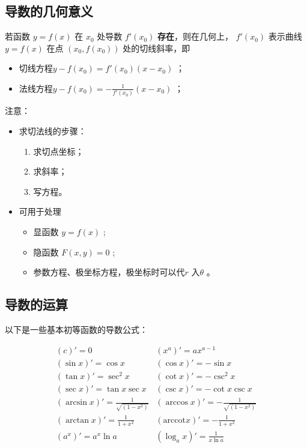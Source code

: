 \subsection{导数的几何意义}

若函数 $ y=f(x) $ 在 $ x_0 $ 处导数 $ f'(x_0) $ \textbf{存在}，则在几何上， $ f'(x_0) $ 表示曲线
$ y=f(x) $ 在点 $ (x_0,f(x_0)) $ 处的切线斜率，即\begin{itemize}
    \item 切线方程$ y-f(x_0)=f'(x_0)(x-x_0) $ ；
    \item 法线方程$ y-f(x_0)=-\frac1{f'(x_0)}(x-x_0) $ ；
\end{itemize}

注意：
\begin{itemize}
    \item 求切法线的步骤：\begin{enumerate}
        \item 求切点坐标；
        \item 求斜率；
        \item 写方程。
    \end{enumerate}
    \item 可用于处理\begin{itemize}
        \item 显函数 $ y=f(x) $ ;
        \item 隐函数 $ F(x,y)=0 $ ;
        \item 参数方程、极坐标方程，极坐标时可以代$ r $ 入$ \theta $ 。
    \end{itemize}
\end{itemize}

\subsection{导数的运算}

以下是一些基本初等函数的导数公式：

\begin{equation*}
    \begin{array}{ll}
        (c)'=0&(x^a)'=ax^{a-1}\\
        (\sin x)'=\cos x&(\cos x)'=-\sin x\\ 
        (\tan x)'=\sec^2 x&(\cot x)'=-\csc^2 x\\ 
        (\sec x)'=\tan x\sec x&(\csc x)'=-\cot x\csc x\\ 
        (\arcsin x)'=\frac{1}{\displaystyle\sqrt{(1-x^2)}}&(\arccos x)'=-\frac{1}{\displaystyle\sqrt{(1-x^2)}}\\
        (\arctan x)'=\frac1{1+x^2} & (\textrm{arccot} x)'=-\frac1{1+x^2}\\
        (a^x)'=a^x\ln a&(\log_a x)'=\frac1{x\ln a}\\
    \end{array}
\end{equation*}

